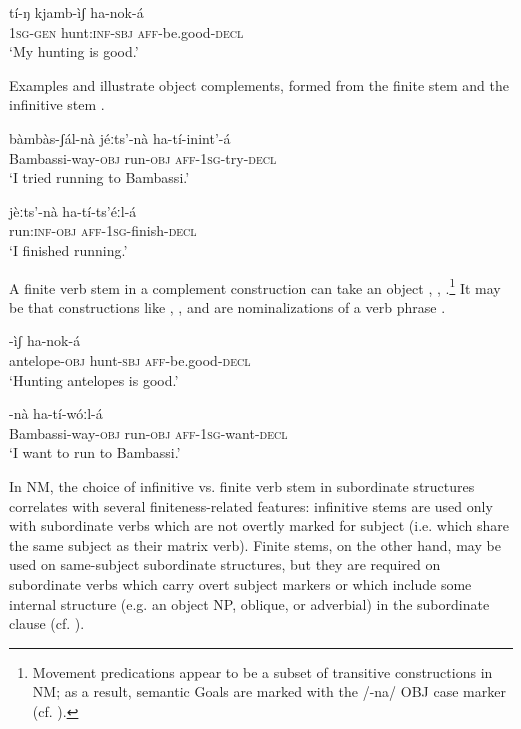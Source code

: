 \documentclass[output=paper]{langsci/langscibook}
\begin{document}
\ea\label{ex:mahland:35}
\gll tí-ŋ         kjamb-ìʃ         ha-nok-á  \\
\textsc{1sg-gen}    hunt:\textsc{inf-sbj}  \textsc{aff}{}-be.good-\textsc{decl} \\
\glt `My hunting is good.'
\z

Examples  and  illustrate object complements, formed from the finite stem  and the infinitive stem . 

\ea\label{ex:mahland:36}
\gll bàmbàs-ʃál-nà            jéːts'-nà    ha-tí-inint'-{\downstep}á\\
Bambassi-way-\textsc{obj}    run\textsc{{}-obj}     \textsc{aff-1sg}{}-try\textsc{{}-decl} \\
\glt `I tried running to Bambassi.'
\z

\ea\label{ex:mahland:37}
\gll jèːts'-nà        ha-tí-ts'éːl-{\downstep}á\\
run:\textsc{inf-obj}   \textsc{aff-1sg}{}-finish-\textsc{decl} \\
\glt `I finished running.'
\z

A finite verb stem in a complement construction can take an object , , .\footnote{Movement predications appear to be a subset of transitive constructions in NM; as a result, semantic Goals are marked with the /-na/ OBJ case marker (cf. \citealt[335-339]{AhlandM2012}).} It may be that constructions like , , and  are nominalizations of a verb phrase \citep[625]{AhlandM2012}.

\ea\label{ex:mahland:38}
-ìʃ     ha-nok-á \\
antelope\textsc{{}-obj}    hunt\textsc{{}-sbj}       \textsc{aff}-be.good\textsc{{}-decl} \\
\glt `Hunting antelopes is good.'
\z

\ea\label{ex:mahland:39}
-nà    ha-tí-wóːl-{\downstep}á\\
{\db}Bambassi-way\textsc{{}-obj}     run\textsc{{}-obj}      \textsc{aff-1sg}{}-want\textsc{{}-decl} \\
\glt `I want to run to Bambassi.'
\z

In NM, the choice of infinitive vs. finite verb stem in subordinate structures correlates with several finiteness-related features: infinitive stems are used only with subordinate verbs which are not overtly marked for subject (i.e. which share the same subject as their matrix verb). Finite stems, on the other hand, may be used on same-subject subordinate structures, but they are required on subordinate verbs which carry overt subject markers or which include some internal structure (e.g. an object NP, oblique, or adverbial) in the subordinate clause (cf. \citealt[612, 630]{AhlandM2012}). 
\end{document}
